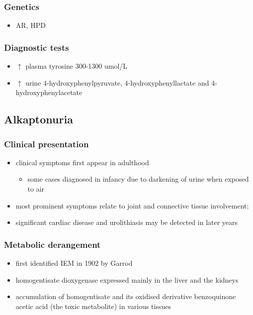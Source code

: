 \documentclass{scrartcl}
\begin{document}
\subsubsection{Genetics}
\label{sec:orgf5d270b}
\begin{itemize}
\item AR, HPD
\end{itemize}
\subsubsection{Diagnostic tests}
\label{sec:org49c7667}
\begin{itemize}
\item \(\uparrow\) plasma tyrosine 300-1300 umol/L
\item \(\uparrow\) urine 4-hydroxyphenylpyruvate, 4-hydroxyphenyllactate and 4-hydroxyphenylacetate
\end{itemize}


\subsection{Alkaptonuria}
\label{sec:org45f5e2d}
\subsubsection{Clinical presentation}
\label{sec:orgc1d0abf}
\begin{itemize}
\item clinical symptoms first appear in adulthood
\begin{itemize}
\item some cases diagnosed in infancy due to darkening of urine when
exposed to air
\end{itemize}
\item most prominent symptoms relate to joint and connective tissue involvement;
\item significant cardiac disease and urolithiasis may be detected in later years
\end{itemize}
\subsubsection{Metabolic derangement}
\label{sec:org6f2b56b}
\begin{itemize}
\item first identified IEM in 1902 by Garrod
\item homogentisate dioxygenase expressed mainly in the liver and the
kidneys
\end{itemize}
\begin{itemize}
\item accumulation of homogentisate and its oxidised derivative
benzoquinone acetic acid (the toxic metabolite) in various tissues
\end{itemize}
\end{document}

